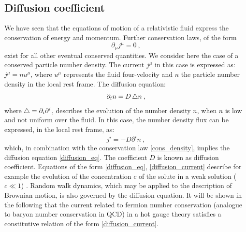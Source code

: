  \subsection{Diffusion coefficient}
 
We have seen that the equations of motion of a relativistic fluid express the conservation of energy and momentum. Further conservation laws, of the form
  \begin{equation}
 \partial_{\mu} j^{\mu} = 0 \: ,
 \label{cons_density}
 \end{equation}
 exist for all other eventual conserved quantities. We consider here the case of a conserved particle number density. The current $j^{\mu}$ in this case is expressed as: $j^{\mu} = n  u^{\mu}$, where $u^{\mu}$ represents the fluid four-velocity and $n$ the particle number density in the local rest frame. The diffusion equation:
  \begin{equation}
 \partial_t n = D \mathop{}\!\mathbin\bigtriangleup n \: ,
 \label{diffusion_eq}
 \end{equation}
 where $\mathop{}\!\mathbin\bigtriangleup = \partial_i \partial^i$, describes the evolution of the number density $n$, when $n$ is low and not uniform over the fluid. In this case, the number density flux can be expressed, in the local rest frame, as:
 \begin{equation}
j^i = - D \partial^i n \: ,
\label{diffusion_current}
\end{equation}
%
which, in combination with the conservation law \ref{cons_density}, implies the diffusion equation \ref{diffusion_eq}. The coefficient $D$ is known as diffusion coefficient. Equations of the form \ref{diffusion_eq}, \ref{diffusion_current} describe for example the evolution of the concentration $c$ of the solute in a weak solution ($c \ll 1$) \cite{landau2013fluid}. Random walk dynamics, which may be applied to the description of Brownian motion, is also governed by the diffusion equation. It will be shown in the following that the current related to fermion number conservation (analogue to baryon number conservation in QCD) in a hot gauge theory satisfies a constitutive relation of the form \ref{diffusion_current}. 




